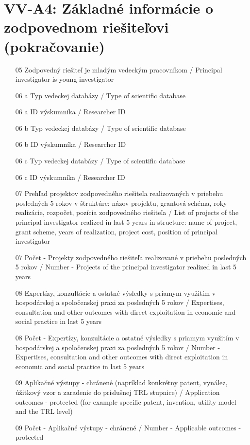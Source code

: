 \section*{VV-A4: Základné informácie o zodpovednom riešiteľovi (pokračovanie)}

\begin{itemize}
    \item[05] Zodpovedný riešiteľ je mladým vedeckým pracovníkom / Principal investigator is young investigator
    \item[06 a] Typ vedeckej databázy / Type of scientific database
    \item[06 a] ID výskumníka / Researcher ID
    \item[06 b] Typ vedeckej databázy / Type of scientific database
    \item[06 b] ID výskumníka / Researcher ID
    \item[06 c] Typ vedeckej databázy / Type of scientific database
    \item[06 c] ID výskumníka / Researcher ID
    \item[07] Prehľad projektov zodpovedného riešiteľa realizovaných v priebehu posledných 5 rokov v štruktúre: názov projektu, grantová schéma, roky realizácie, rozpočet, pozícia zodpovedného riešiteľa / List of projects of the principal investigator realized in last 5 years in structure: name of project, grant scheme, years of realization, project cost, position of principal investigator
    \item[07] Počet - Projekty zodpovedného riešiteľa realizované v priebehu posledných 5 rokov / Number - Projects of the principal investigator realized in last 5 years
    \item[08] Expertízy, konzultácie a ostatné výsledky s priamym využitím v hospodárskej a spoločenskej praxi za posledných 5 rokov / Expertises, consultation and other outcomes with direct exploitation in economic and social practice in last 5 years
    \item[08] Počet - Expertízy, konzultácie a ostatné výsledky s priamym využitím v hospodárskej a spoločenskej praxi za posledných 5 rokov / Number - Expertises, consultation and other outcomes with direct exploitation in economic and social practice in last 5 years
    \item[09] Aplikačné výstupy - chránené (napríklad konkrétny patent, vynález, úžitkový vzor a zaradenie do príslušnej TRL stupnice) / Application outcomes - protected (for example specific patent, invention, utility model and the TRL level)
    \item[09] Počet - Aplikačné výstupy - chránené / Number - Applicable outcomes - protected
\end{itemize}
